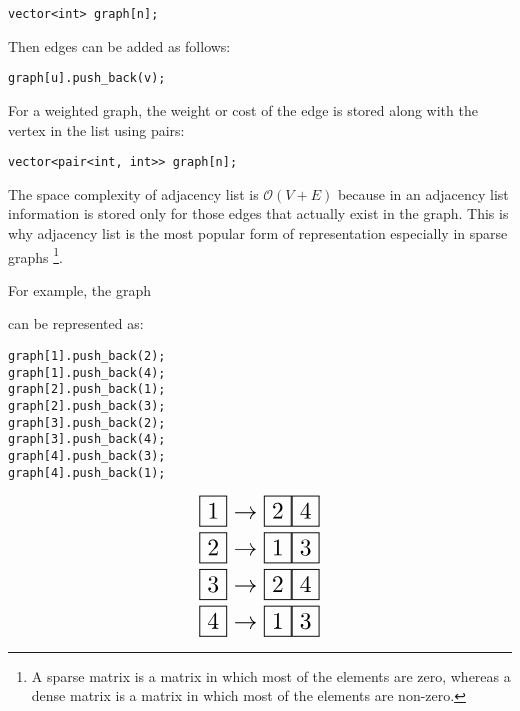\documentclass[twoside,12pt,a4paper,english]{book}
\theoremstyle{definition}
\theoremstyle{problemstyle}
\theoremstyle{problemstyle}
\theoremstyle{problemstyle}
\begin{document}
\begin{lstlisting}
vector<int> graph[n];
\end{lstlisting}

Then edges can be added as follows:

\begin{lstlisting}
graph[u].push_back(v);
\end{lstlisting}

For a weighted graph, the weight or cost of the edge is stored along with the vertex in the list using pairs:

\begin{lstlisting}
vector<pair<int, int>> graph[n];
\end{lstlisting}

The space complexity of adjacency list is $\mathcal{O}(V + E)$ because in an adjacency list information is stored only for those edges that actually exist in the graph. This is why adjacency list is the most popular form of representation especially in sparse graphs \footnote{A sparse matrix is a matrix in which most of the elements are zero, whereas a dense matrix is a matrix in which most of the elements are non-zero.}.

For example, the graph

\begin{center}
\end{center}

can be represented as:
\begin{lstlisting}
graph[1].push_back(2);
graph[1].push_back(4);
graph[2].push_back(1);
graph[2].push_back(3);
graph[3].push_back(2);
graph[3].push_back(4);
graph[4].push_back(3);
graph[4].push_back(1);
\end{lstlisting}

\begin{align*}
\resizebox{0.25\hsize}{!}{$\fbox{1}\rightarrow\fbox{2}\fbox{4}$}\\
\resizebox{0.25\hsize}{!}{$\fbox{2}\rightarrow\fbox{1}\fbox{3}$}\\
\resizebox{0.25\hsize}{!}{$\fbox{3}\rightarrow\fbox{2}\fbox{4}$} \\
\resizebox{0.25\hsize}{!}{$\fbox{4}\rightarrow\fbox{1}\fbox{3}$}
\end{align*}
\end{document}
